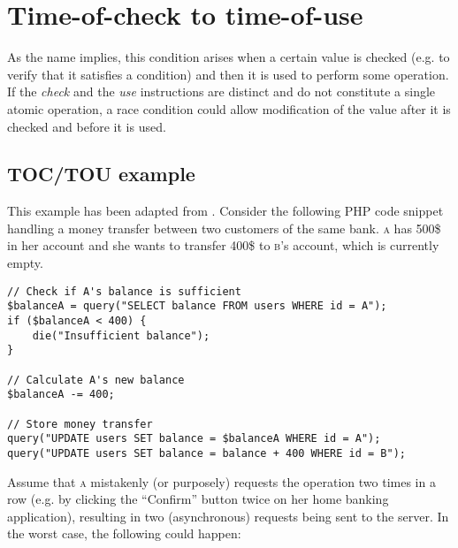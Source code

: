 \section{Time-of-check to time-of-use}

As the name implies, this condition arises when a certain value is checked (e.g. to verify that it satisfies a condition) and then it is used to perform some operation. If the \textit{check} and the \textit{use} instructions are distinct and do not constitute a single atomic operation, a race condition could allow modification of the value after it is checked and before it is used.

\subsection{TOC/TOU example}

This example has been adapted from \citep{courseslides}. Consider the following PHP code snippet handling a money transfer between two customers of the same bank. \textsc{a} has 500\$ in her account and she wants to transfer 400\$ to \textsc{b}'s account, which is currently empty.

\begin{verbatim}
// Check if A's balance is sufficient
$balanceA = query("SELECT balance FROM users WHERE id = A");
if ($balanceA < 400) {
    die("Insufficient balance");
}

// Calculate A's new balance
$balanceA -= 400;

// Store money transfer
query("UPDATE users SET balance = $balanceA WHERE id = A");
query("UPDATE users SET balance = balance + 400 WHERE id = B");
\end{verbatim}

Assume that \textsc{a} mistakenly (or purposely) requests the operation two times in a row (e.g. by clicking the ``Confirm'' button twice on her home banking application), resulting in two (asynchronous) requests being sent to the server. In the worst case, the following could happen:

